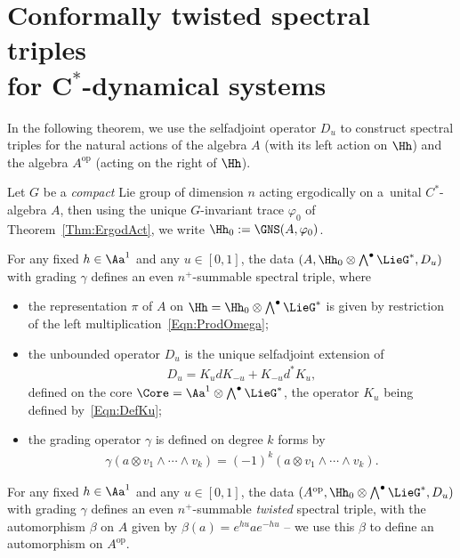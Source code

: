 \section[Conformally twisted spectral triples for $C^*$-dynamical systems]{Conformally twisted spectral triples\\ for $\boldsymbol{C^*}$-dynamical systems}
\label{Sec:ConfTwistedTrSp}

In the following theorem, we use the selfadjoint operator $D_u$ to construct spectral triples for the natural actions of the algebra $A$ (with its left action on $\Hh$) and the algebra $A^\text{op}$ (acting on the right of $\Hh$).
\begin{Theorem}
\label{Thm:Main}
Let $G$ be a \emph{compact} Lie group of dimension $n$ acting ergodically on a~unital $C^*$-algebra $A$, then using the unique $G$-invariant trace $\varphi_0$ of Theorem~{\rm \ref{Thm:ErgodAct}}, we write $\Hh_0 := \GNS(A, \varphi_0)$.

For any fixed $h \in \Aa^1$ and any $u \in [0,1]$, the data $(A, \Hh_0 \otimes \bigwedge^\bullet \LieG^*, D_u)$ with grading $\gamma$ defines an even $n^+$-summable spectral triple, where
\begin{itemize}\itemsep=0pt
\item
the representation $\pi$ of $A$ on $\Hh = \Hh_0 \otimes \bigwedge^\bullet \LieG^*$ is given by restriction of the left multiplication~\eqref{Eqn:ProdOmega};
\item
the unbounded operator $D_u$ is the unique selfadjoint extension of
\begin{gather*}
D_{u} = K_{u} d K_{-u} + K_{-u} d^* K_{u},
\end{gather*}
defined on the core $\Core = \Aa^1 \otimes \bigwedge^\bullet \LieG^*$, the operator $K_u$ being defined by~\eqref{Eqn:DefKu};
\item
the grading operator $\gamma$ is defined on degree $k$ forms by
\begin{gather*}
\gamma( a \otimes v_1 \wedge \cdots \wedge v_k) = (-1)^k ( a \otimes v_1 \wedge \cdots \wedge v_k).
\end{gather*}
\end{itemize}
For any fixed $h \in \Aa^1$ and any $u \in [0,1]$, the data $(A^\text{op}, \Hh_0 \otimes \bigwedge^\bullet \LieG^*, D_u)$ with grading $\gamma$ defines an even $n^+$-summable \emph{twisted} spectral triple, with the automorphism $\beta$ on $A$ given by $\beta(a) = e^{h u} a e^{-h u}$ -- we use this $\beta$ to define an automorphism on $A^\text{op}$.
\end{Theorem}

